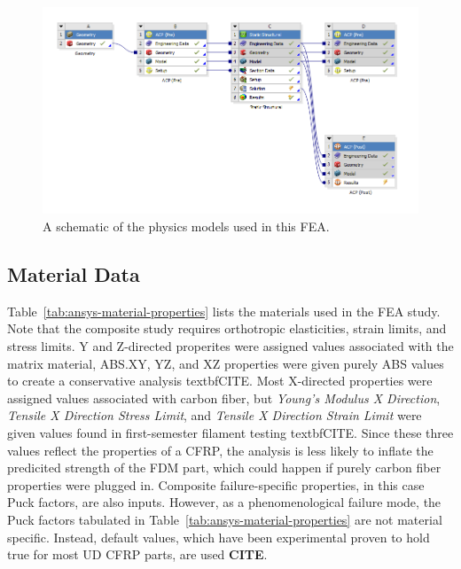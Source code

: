 \begin{figure}[htp]
\centering
\includegraphics[width=1\textwidth]{./figures/fea/fea-project-schematic}
\caption{A schematic of the physics models used in this FEA.}
\label{fig:fea-project-schematic}
\end{figure}

\clearpage

\subsection{Material Data}

\indent

Table~\ref{tab:ansys-material-properties} lists the materials used in the FEA study. Note that the composite study requires orthotropic elasticities, strain limits, and stress limits. Y and Z-directed properites were assigned values associated with the matrix material, ABS.XY, YZ, and XZ properties were given purely ABS values to create a conservative analysis \large{textbf{CITE}}. Most X-directed properties were assigned values associated with carbon fiber, but \textit{Young's Modulus X Direction}, \textit{Tensile X Direction Stress Limit}, and \textit{Tensile X Direction Strain Limit} were given values found in first-semester filament testing \large{textbf{CITE}}. Since these three values reflect the properties of a CFRP, the analysis is less likely to inflate the predicited strength of the FDM part, which could happen if purely carbon fiber properties were plugged in. Composite failure-specific properties, in this case Puck factors, are also inputs. However, as a phenomenological failure mode, the Puck factors tabulated in Table~\ref{tab:ansys-material-properties} are not material specific. Instead, default values, which have been experimental proven to hold true for most UD CFRP parts, are used \large{\textbf{CITE}}.\\

